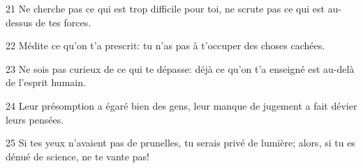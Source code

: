 21 Ne cherche pas ce qui est trop difficile pour toi, ne scrute pas ce qui est au-dessus de tes forces.

22 Médite ce qu’on t’a prescrit: tu n’as pas à t’occuper des choses cachées.

23 Ne sois pas curieux de ce qui te dépasse: déjà ce qu’on t’a enseigné est au-delà de l’esprit humain.

24 Leur présomption a égaré bien des gens, leur manque de jugement a fait dévier leurs pensées.

25 Si tes yeux n’avaient pas de prunelles, tu serais privé de lumière; alors, si tu es dénué de science, ne te vante pas!
